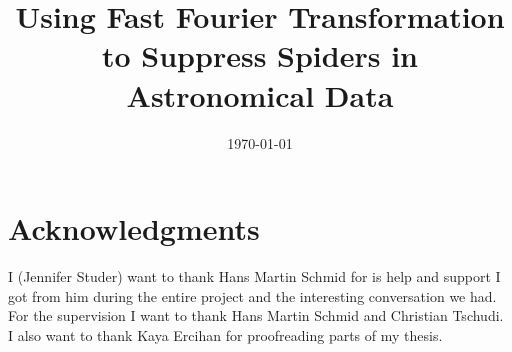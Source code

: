 \documentclass[a4paper,10pt,oneside, fleqn]{article}
\title{Using Fast Fourier Transformation to Suppress Spiders in Astronomical Data}
\date{\today}
\begin{document}
\maketitle

\pagestyle{fancy}               	%

\vspace*{\fill}
\begin{abstract}

\end{abstract}
\vspace*{\fill}
\newpage

\tableofcontents
\newpage







%
%


\section{Acknowledgments}
I (Jennifer Studer) want to thank Hans Martin Schmid for is help and support I got from him during the entire project and the interesting conversation we had. For the supervision I want to thank Hans Martin Schmid and Christian Tschudi. I also want to thank Kaya Ercihan for proofreading parts of my thesis. 

\newpage 

\appendix


\newpage


\end{document}
